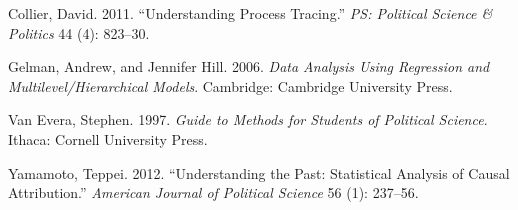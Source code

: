 \documentclass[
]{article}
\begin{document}
\leavevmode\hypertarget{ref-collier2011understanding}{}%
Collier, David. 2011. ``Understanding Process Tracing.'' \emph{PS:
Political Science \& Politics} 44 (4): 823--30.

\leavevmode\hypertarget{ref-gelman2006data}{}%
Gelman, Andrew, and Jennifer Hill. 2006. \emph{Data Analysis Using
Regression and Multilevel/Hierarchical Models}. Cambridge: Cambridge
University Press.

\leavevmode\hypertarget{ref-VanEvera1997}{}%
Van Evera, Stephen. 1997. \emph{Guide to Methods for Students of
Political Science}. Ithaca: Cornell University Press.

\leavevmode\hypertarget{ref-yamamoto2012understanding}{}%
Yamamoto, Teppei. 2012. ``Understanding the Past: Statistical Analysis
of Causal Attribution.'' \emph{American Journal of Political Science} 56
(1): 237--56.
\end{document}
